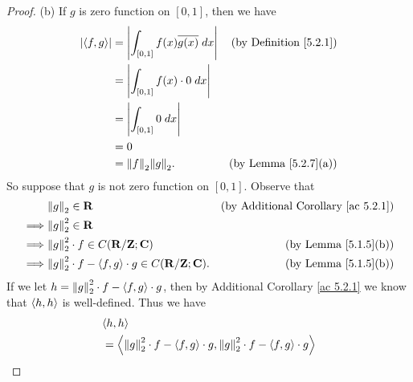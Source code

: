 \begin{proof}{(b)}
    If \(g\) is zero function on \([0, 1]\), then we have
    \begin{align*}
        \abs*{\inner*{f, g}} & = \abs*{\int_{[0, 1]} f(x) \overline{g(x)} \; dx} & \text{(by Definition \ref{5.2.1})} \\
                             & = \abs*{\int_{[0, 1]} f(x) \cdot 0 \; dx}                                              \\
                             & = \abs*{\int_{[0, 1]} 0 \; dx}                                                         \\
                             & = 0                                                                                    \\
                             & = \norm*{f}_2 \norm*{g}_2.                        & \text{(by Lemma \ref{5.2.7}(a))}
    \end{align*}
    So suppose that \(g\) is not zero function on \([0, 1]\).
    Observe that
    \begin{align*}
                 & \norm*{g}_2 \in \mathbf{R}                                                                 & \text{(by Additional Corollary \ref{ac 5.2.1})} \\
        \implies & \norm*{g}_2^2 \in \mathbf{R}                                                                                                                 \\
        \implies & \norm*{g}_2^2 \cdot f \in C(\mathbf{R} / \mathbf{Z} ; \mathbf{C})                          & \text{(by Lemma \ref{5.1.5}(b))}                \\
        \implies & \norm*{g}_2^2 \cdot f - \inner*{f, g} \cdot g \in C(\mathbf{R} / \mathbf{Z} ; \mathbf{C}). & \text{(by Lemma \ref{5.1.5}(b))}
    \end{align*}
    If we let \(h = \norm*{g}_2^2 \cdot f - \inner*{f, g} \cdot g\), then by Additional Corollary \ref{ac 5.2.1} we know that \(\inner*{h, h}\) is well-defined.
    Thus we have
    \begin{align*}
         & \inner*{h, h}                                                                                                                                                              \\
         & = \inner*{\norm*{g}_2^2 \cdot f - \inner*{f, g} \cdot g, \norm*{g}_2^2 \cdot f - \inner*{f, g} \cdot g}                                                                    \\

\end{align*}
\end{proof}
